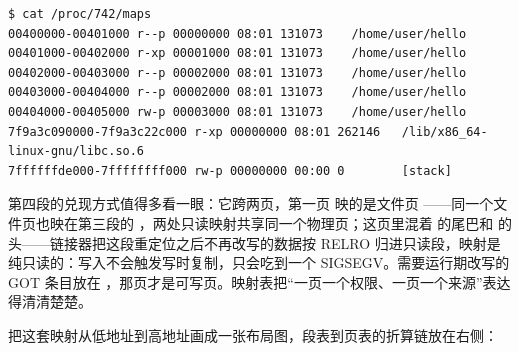 \begin{lstlisting}
$ cat /proc/742/maps
00400000-00401000 r--p 00000000 08:01 131073    /home/user/hello
00401000-00402000 r-xp 00001000 08:01 131073    /home/user/hello
00402000-00403000 r--p 00002000 08:01 131073    /home/user/hello
00403000-00404000 r--p 00002000 08:01 131073    /home/user/hello
00404000-00405000 rw-p 00003000 08:01 131073    /home/user/hello
7f9a3c090000-7f9a3c22c000 r-xp 00000000 08:01 262146   /lib/x86_64-linux-gnu/libc.so.6
7ffffffde000-7ffffffff000 rw-p 00000000 00:00 0        [stack]
\end{lstlisting}

第四段的兑现方式值得多看一眼：它跨两页，第一页  映的是文件页 ——同一个文件页也映在第三段的 ，两处只读映射共享同一个物理页；这页里混着  的尾巴和  的头——链接器把这段重定位之后不再改写的数据按 RELRO 归进只读段，映射是纯只读的：写入不会触发写时复制，只会吃到一个 SIGSEGV。需要运行期改写的 GOT 条目放在 ，那页才是可写页。映射表把“一页一个权限、一页一个来源”表达得清清楚楚。

把这套映射从低地址到高地址画成一张布局图，段表到页表的折算链放在右侧：

